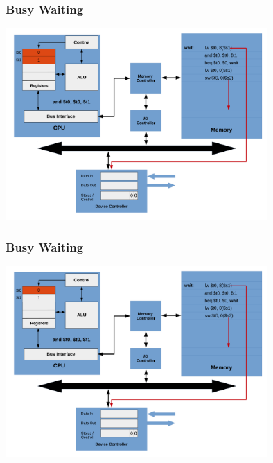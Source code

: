 \documentclass{beamer}
\begin{document}
\begin{frame}%
\frametitle{Busy Waiting}

\vspace*{-0.2cm}
\begin{center}
\hspace*{-1cm}\includegraphics[width=10cm]{busy_waiting6.pdf}
\end{center}

\end{frame}

\begin{frame}%
\frametitle{Busy Waiting}

\vspace*{-0.2cm}
\begin{center}
\hspace*{-1cm}\includegraphics[width=10cm]{busy_waiting7.pdf}
\end{center}

\end{frame}
\end{document}
